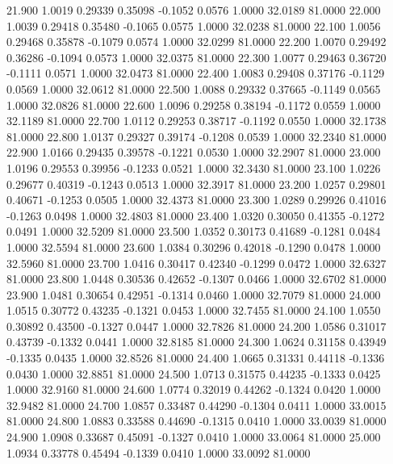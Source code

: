   21.900   1.0019   0.29339   0.35098  -0.1052   0.0576   1.0000  32.0189  81.0000
  22.000   1.0039   0.29418   0.35480  -0.1065   0.0575   1.0000  32.0238  81.0000
  22.100   1.0056   0.29468   0.35878  -0.1079   0.0574   1.0000  32.0299  81.0000
  22.200   1.0070   0.29492   0.36286  -0.1094   0.0573   1.0000  32.0375  81.0000
  22.300   1.0077   0.29463   0.36720  -0.1111   0.0571   1.0000  32.0473  81.0000
  22.400   1.0083   0.29408   0.37176  -0.1129   0.0569   1.0000  32.0612  81.0000
  22.500   1.0088   0.29332   0.37665  -0.1149   0.0565   1.0000  32.0826  81.0000
  22.600   1.0096   0.29258   0.38194  -0.1172   0.0559   1.0000  32.1189  81.0000
  22.700   1.0112   0.29253   0.38717  -0.1192   0.0550   1.0000  32.1738  81.0000
  22.800   1.0137   0.29327   0.39174  -0.1208   0.0539   1.0000  32.2340  81.0000
  22.900   1.0166   0.29435   0.39578  -0.1221   0.0530   1.0000  32.2907  81.0000
  23.000   1.0196   0.29553   0.39956  -0.1233   0.0521   1.0000  32.3430  81.0000
  23.100   1.0226   0.29677   0.40319  -0.1243   0.0513   1.0000  32.3917  81.0000
  23.200   1.0257   0.29801   0.40671  -0.1253   0.0505   1.0000  32.4373  81.0000
  23.300   1.0289   0.29926   0.41016  -0.1263   0.0498   1.0000  32.4803  81.0000
  23.400   1.0320   0.30050   0.41355  -0.1272   0.0491   1.0000  32.5209  81.0000
  23.500   1.0352   0.30173   0.41689  -0.1281   0.0484   1.0000  32.5594  81.0000
  23.600   1.0384   0.30296   0.42018  -0.1290   0.0478   1.0000  32.5960  81.0000
  23.700   1.0416   0.30417   0.42340  -0.1299   0.0472   1.0000  32.6327  81.0000
  23.800   1.0448   0.30536   0.42652  -0.1307   0.0466   1.0000  32.6702  81.0000
  23.900   1.0481   0.30654   0.42951  -0.1314   0.0460   1.0000  32.7079  81.0000
  24.000   1.0515   0.30772   0.43235  -0.1321   0.0453   1.0000  32.7455  81.0000
  24.100   1.0550   0.30892   0.43500  -0.1327   0.0447   1.0000  32.7826  81.0000
  24.200   1.0586   0.31017   0.43739  -0.1332   0.0441   1.0000  32.8185  81.0000
  24.300   1.0624   0.31158   0.43949  -0.1335   0.0435   1.0000  32.8526  81.0000
  24.400   1.0665   0.31331   0.44118  -0.1336   0.0430   1.0000  32.8851  81.0000
  24.500   1.0713   0.31575   0.44235  -0.1333   0.0425   1.0000  32.9160  81.0000
  24.600   1.0774   0.32019   0.44262  -0.1324   0.0420   1.0000  32.9482  81.0000
  24.700   1.0857   0.33487   0.44290  -0.1304   0.0411   1.0000  33.0015  81.0000
  24.800   1.0883   0.33588   0.44690  -0.1315   0.0410   1.0000  33.0039  81.0000
  24.900   1.0908   0.33687   0.45091  -0.1327   0.0410   1.0000  33.0064  81.0000
  25.000   1.0934   0.33778   0.45494  -0.1339   0.0410   1.0000  33.0092  81.0000
